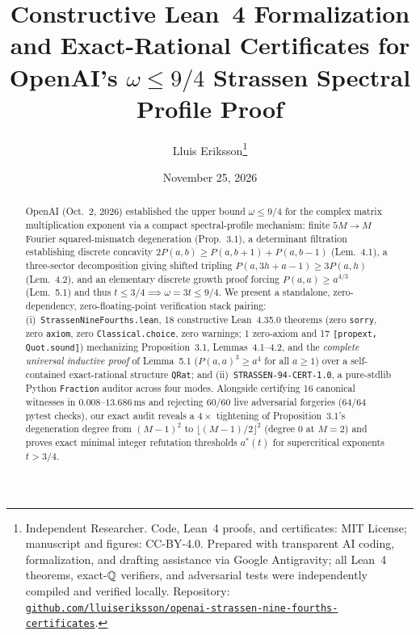 \documentclass[10pt,twocolumn]{article}
\title{\vspace{-1.0em}\textbf{Constructive Lean~4 Formalization and Exact-Rational Certificates for OpenAI's $\omega \le 9/4$ Strassen Spectral Profile Proof}}
\author{Lluis Eriksson\thanks{Independent Researcher. Code, Lean~4 proofs, and certificates: MIT License; manuscript and figures: CC-BY-4.0. Prepared with transparent AI coding, formalization, and drafting assistance via Google Antigravity; all Lean~4 theorems, exact-$\mathbb{Q}$ verifiers, and adversarial tests were independently compiled and verified locally. Repository: \href{https://github.com/lluiseriksson/openai-strassen-nine-fourths-certificates}{\nolinkurl{github.com/lluiseriksson/openai-strassen-nine-fourths-certificates}}.}}
\date{November 25, 2026}
\begin{document}
\maketitle
\vspace{-1.3em}

\begin{abstract}
OpenAI (Oct.~2, 2026) established the upper bound $\omega \le 9/4$ for the complex matrix multiplication exponent via a compact spectral-profile mechanism: finite $5M \to M$ Fourier squared-mismatch degeneration (Prop.~3.1), a determinant filtration establishing discrete concavity $2P(a,b)\ge P(a,b+1)+P(a,b-1)$ (Lem.~4.1), a three-sector decomposition giving shifted tripling $P(a,3h+a-1)\ge 3P(a,h)$ (Lem.~4.2), and an elementary discrete growth proof forcing $P(a,a)\ge a^{4/3}$ (Lem.~5.1) and thus $t \le 3/4 \implies \omega = 3t \le 9/4$. We present a standalone, zero-dependency, zero-floating-point verification stack pairing: (i)~\texttt{StrassenNineFourths.lean}, 18 constructive Lean~4.35.0 theorems (zero \texttt{sorry}, zero \texttt{axiom}, zero \texttt{Classical.choice}, zero warnings; 1 zero-axiom and 17 \texttt{[propext, Quot.sound]}) mechanizing Proposition~3.1, Lemmas~4.1--4.2, and the \emph{complete universal inductive proof} of Lemma~5.1 ($P(a,a)^3 \ge a^4$ for all $a \ge 1$) over a self-contained exact-rational structure \texttt{QRat}; and (ii)~\texttt{STRASSEN-94-CERT-1.0}, a pure-stdlib Python \texttt{Fraction} auditor across four modes. Alongside certifying 16 canonical witnesses in $0.008$--$13.686\,\mathrm{ms}$ and rejecting 60/60 live adversarial forgeries (64/64 pytest checks), our exact audit reveals a $4\times$ tightening of Proposition~3.1's degeneration degree from $(M-1)^2$ to $\lfloor(M-1)/2\rfloor^2$ (degree $0$ at $M=2$) and proves exact minimal integer refutation thresholds $a^*(t)$ for supercritical exponents $t > 3/4$.
\end{abstract}
\end{document}

